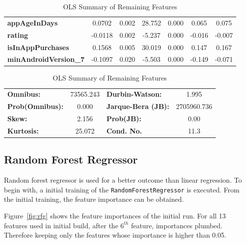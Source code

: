 \begin{table}
\begin{center}
\begin{tabular}{lcccccc}
        \textbf{appAgeInDays}         &       0.0702  &        0.002     &    28.752  &         0.000        &        0.065    &        0.075     \\
        \textbf{rating}               &      -0.0118  &        0.002     &    -5.237  &         0.000        &       -0.016    &       -0.007     \\
        \textbf{isInAppPurchases}     &       0.1568  &        0.005     &    30.019  &         0.000        &        0.147    &        0.167     \\
        \textbf{minAndroidVersion\_7} &      -0.1097  &        0.020     &    -5.503  &         0.000        &       -0.149    &       -0.071     \\
        \bottomrule
        \end{tabular}
        \end{center}
        \begin{tabular}{lclc}
        \textbf{Omnibus:}       & 73565.243 & \textbf{  Durbin-Watson:     } &      1.995   \\
        \textbf{Prob(Omnibus):} &    0.000  & \textbf{  Jarque-Bera (JB):  } & 2705960.736  \\
        \textbf{Skew:}          &    2.156  & \textbf{  Prob(JB):          } &       0.00   \\
        \textbf{Kurtosis:}      &   25.072  & \textbf{  Cond. No.          } &       11.3   \\
        \bottomrule
        \end{tabular}
        
    \caption{OLS Summary of Remaining Features}
    \label{tab:ols-2}
\end{table}

\subsection{Random Forest Regressor}

Random forest regressor is used for a better outcome than linear regression. To begin with, a initial training of the \texttt{RandomForestRegressor} is executed. From the initial training, the feature importance can be obtained.

Figure~\ref{fig:rfg} shows the feature importances of the initial run. For all 13 features used in initial build, after the $6^{th}$ feature, importances plumbed. Therefore keeping only the features whose importance is higher than 0.05. 

